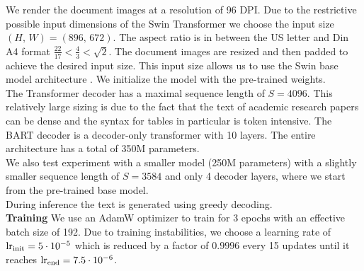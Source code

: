 \documentclass[]{article}
\newcommand{\para}[1]{\textbf{#1} \quad}
\begin{document}
We render the document images at a resolution of 96 DPI. Due to the restrictive possible input dimensions of the Swin Transformer we choose the input size $(H,\,W) = (896,\,672)$. The aspect ratio is in between the US letter and Din A4 format $\frac{22}{17}<\frac43<\sqrt 2$. The document images are resized and then padded to achieve the desired input size. This input size allows us to use the Swin base model architecture \cite{liu_swin_2021}. We initialize the model with the pre-trained weights.\\
The Transformer decoder has a maximal sequence length of $S=4096$. This relatively large sizing is due to the fact that the text of academic research papers can be dense and the syntax for tables in particular is token intensive. The BART decoder is a decoder-only transformer with 10 layers. The entire architecture has a total of 350M parameters.
\\We also test experiment with a smaller model (250M parameters) with a slightly smaller sequence length of $S=3584$ and only 4 decoder layers, where we start from the pre-trained base model. \\During inference the text is generated using greedy decoding. 
\\\para{Training} We use an AdamW optimizer \cite{loshchilov_decoupled_2019} to train for 3 epochs with an effective batch size of 192. Due to training instabilities, %
we choose a learning rate of $\mathrm{lr}_{\rm init}=5\cdot10^{-5}$ which is reduced by a factor of $0.9996$ every 15 updates until it reaches $\mathrm{lr}_{\rm end}=7.5\cdot10^{-6}$.
\end{document}
